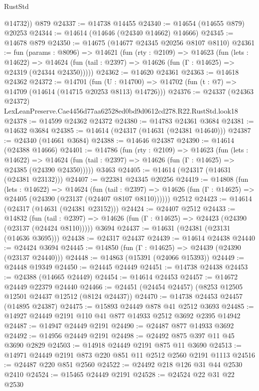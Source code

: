 \begin{lexlean}{RustStd}
\begin{coremodule}
        @14732))
    @879
@24337 := @14738 @14455
@24340 := @14654 (@14655 @879) @20253
@24344 := @14614 (@14646 (@24340 @14662) @14666)
@24345 := @14678 @879
@24350 := @14675 (@14677 @24345 @20256 @8107 @8110)
@24361 := fun (params : @8096) =>
  @14621
    (fun (rty : @2109) =>
    @14623
      (fun (lets : @14622) =>
      @14624 (fun (tail : @2397) => @14626 (fun (Γ : @14625) => @24319 (@24344 @24350)))))
@24362 := @14620 @24361
@24363 := @14618 @24362
@24372 := @14701
    (fun (U : @14700) => @14702 (fun (t : @7) => @14709 (@14614 (@14715 @20253 @8113) @14726)))
@24376 := @24337
    (@24363 @24372)
    LexLeanPreserve.Cae4456d77aa62528ed0bd9d0612cd278.R22.RustStd.look18
@24378 := @14599 @24362 @24372
@24380 := @14783 @24361 @3684
@24381 := @14632 @3684
@24385 := @14614 (@24317 (@14631 (@24381 @14640)))
@24387 := @24340 (@14661 @3684)
@24388 := @14646 @24387
@24390 := @14614 (@24388 @14666)
@24401 := @14786
    (fun (rty : @2109) =>
    @14623
      (fun (lets : @14622) =>
      @14624 (fun (tail : @2397) => @14626 (fun (Γ : @14625) => @24385 (@24390 @24350)))))
    @3463
@24405 := @14614 (@24317 (@14631 (@24381 @23132)))
@24407 := @22381 @24345 @20256
@24419 := @14808
    (fun (lets : @14622) =>
    @14624
      (fun (tail : @2397) =>
      @14626 (fun (Γ : @14625) => @24405 (@24390 (@23137 (@24407 @8107 @8110))))))
    @2512
@24423 := @14614 (@24317 (@14631 (@24381 @23152)))
@24424 := @24407 @2512
@24433 := @14832
    (fun (tail : @2397) => @14626 (fun (Γ : @14625) => @24423 (@24390 (@23137 (@24424 @8110)))))
    @3694
@24437 := @14631 (@24381 (@23131 (@14636 @3695)))
@24438 := @24317 @24437
@24439 := @14614 @24438
@24440 := @24424 @3694
@24445 := @14850 (fun (Γ : @14625) => @24439 (@24390 (@23137 @24440)))
@24448 := @14863 (@15391 (@24066 @15393))
@24449 := @24448 @19349
@24450 := @24445 @24449
@24451 := @14738 @24438
@24453 := @24388 (@14665 @24449)
@24454 := @14614 @24453
@24457 := @14672 @24449 @22379 @24440
@24466 := @24451 (@24454 @24457) (@8253 @12505 @12501 @24437 @12512 (@8124 @24437))
@24470 := @14738 @24453 @24457 (@14895 @24387)
@24475 := @15893 @24449 @878 @41 @2512 @3693
@24485 := @14927 @24449 @2191 @110 @41 @877 @14933 @2512 @3692 @2395 @14942
@24487 := @14947 @24449 @2191
@24490 := @24487 @877 @14933 @3692
@24492 := @14956 @24449 @2191
@24498 := @24492 @875 @397 @11 @45 @3690 @2829
@24503 := @14918 @24449 @2191 @875 @11 @3690
@24513 := @14971 @24449 @2191 @873 @220 @851 @11 @2512 @2560 @2191 @1113
@24516 := @24487 @220 @851 @2560
@24522 := @24492 @218 @126 @31 @44 @2530 @2410
@24524 := @15465 @24449 @2191
@24528 := @24524 @22 @31 @22 @2530

\end{coremodule}
\end{lexlean}
